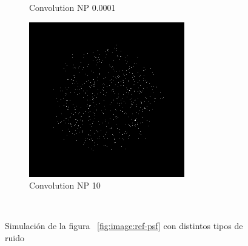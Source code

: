 \documentclass{./packages/optica-article}
\begin{document}
\begin{figure}[hbp]
\begin{center}
\begin{subfigure}[t]{0.25\textwidth}
			\caption{Convolution NP 0.0001}
		\end{subfigure}
		\hfill
		\begin{subfigure}[t]{0.25\textwidth}\centering
			\centering
			\includegraphics[width=\textwidth]{Simulation deconvolution/ref_np_10}
			\caption{Convolution NP 10}
		\end{subfigure}
		\hfill\,
		\caption{Simulación de la figura ~\ref{fig:image:ref-psf} con distintos tipos de ruido}\label{fig:convolutions}
	\end{center}
\end{figure}
\end{document}
